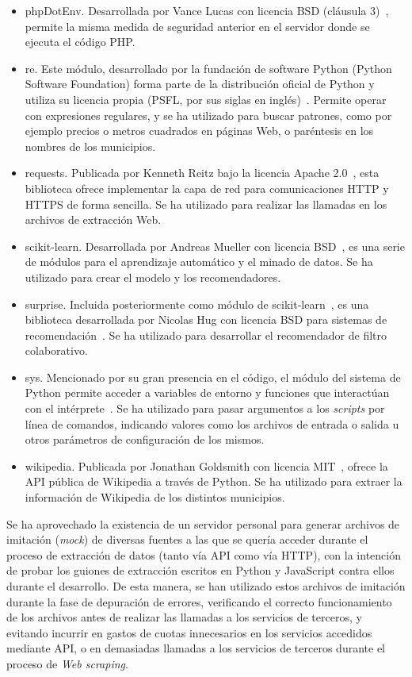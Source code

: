 \begin{itemize}
    \item phpDotEnv. Desarrollada por Vance Lucas con licencia BSD (cláusula 3)~\cite{phpdotenv}, permite la misma medida de seguridad anterior en el servidor donde se ejecuta el código PHP.
    \item re. Este módulo, desarrollado por la fundación de software Python (\guillemotleft Python Software Foundation\guillemotright) forma parte de la distribución oficial de Python y utiliza su licencia propia (PSFL, por sus siglas en inglés)~\cite{re}. Permite operar con expresiones regulares, y se ha utilizado para buscar patrones, como por ejemplo precios o metros cuadrados en páginas Web, o paréntesis en los nombres de los municipios.
    \item requests. Publicada por Kenneth Reitz bajo la licencia Apache 2.0~\cite{requests}, esta biblioteca ofrece implementar la capa de red para comunicaciones HTTP y HTTPS de forma sencilla. Se ha utilizado para realizar las llamadas en los archivos de extracción Web.
    \item scikit-learn. Desarrollada por Andreas Mueller con licencia BSD~\cite{scikit}, es una serie de módulos para el aprendizaje automático y el minado de datos. Se ha utilizado para crear el modelo y los recomendadores.
    \item surprise. Incluida posteriormente como módulo de scikit-learn~\cite{scikit_surprise}, es una biblioteca desarrollada por Nicolas Hug con licencia BSD para sistemas de recomendación~\cite{surprise}. Se ha utilizado para desarrollar el recomendador de filtro colaborativo.
    \item sys. Mencionado por su gran presencia en el código, el módulo del sistema de Python permite acceder a variables de entorno y funciones que interactúan con el intérprete~\cite{sys}. Se ha utilizado para pasar argumentos a los \textit{scripts} por línea de comandos, indicando valores como los archivos de entrada o salida u otros parámetros de configuración de los mismos.
    \item wikipedia. Publicada por Jonathan Goldsmith con licencia MIT~\cite{wikipedia_py}, ofrece la API pública de Wikipedia a través de Python. Se ha utilizado para extraer la información de Wikipedia de los distintos municipios.
\end{itemize}

Se ha aprovechado la existencia de un servidor personal para generar archivos de imitación (\textit{mock}) de diversas fuentes a las que se quería acceder durante el proceso de extracción de datos (tanto vía API como vía HTTP), con la intención de probar los guiones de extracción escritos en Python y JavaScript contra ellos durante el desarrollo. De esta manera, se han utilizado estos archivos de imitación durante la fase de depuración de errores, verificando el correcto funcionamiento de los archivos antes de realizar las llamadas a los servicios de terceros, y evitando incurrir en gastos de cuotas innecesarios en los servicios accedidos mediante API, o en demasiadas llamadas a los servicios de terceros durante el proceso de \textit{Web scraping}.

